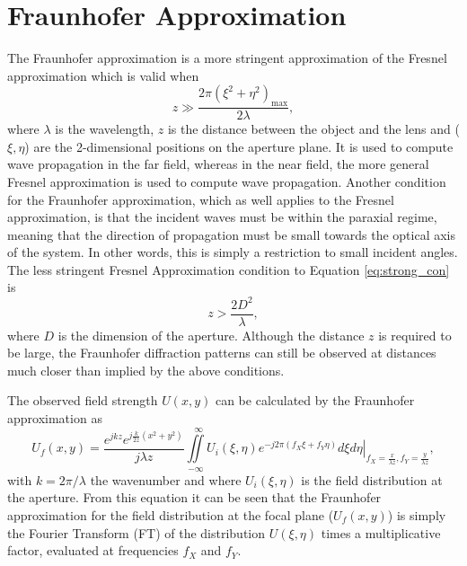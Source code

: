 \section{Fraunhofer Approximation}
\label{sec:FrApprox}
The Fraunhofer approximation is a more stringent approximation of the Fresnel approximation which is valid when
\begin{equation}
z\gg\frac{2\pi(\xi^2+\eta^2)_{\text{max}}}{2\lambda},
\label{eq:strong_con}
\end{equation}
where $\lambda$ is the wavelength, $z$ is the distance between the object and the lens and ($\xi,\eta$) are the 2-dimensional positions on the aperture plane. It is used to compute wave propagation in the far field, whereas in the near field, the more general Fresnel approximation is used to compute wave propagation. Another condition for the Fraunhofer approximation, which as well applies to the Fresnel approximation, is that the incident waves must be within the paraxial regime, meaning that the direction of propagation must be small towards the optical axis of the system. In other words, this is simply a restriction to small incident angles. The less stringent Fresnel Approximation condition to Equation \eqref{eq:strong_con} is 
\begin{equation}
z>\frac{2D^2}{\lambda},
\label{eq:normal_con}
\end{equation}
where $D$ is the dimension of the aperture. Although the distance $z$ is required to be large, the Fraunhofer diffraction patterns can still be observed at distances much closer than implied by the above conditions. 

The observed field strength $U(x,y)$ can be calculated by the Fraunhofer approximation as
\begin{equation}
U_f(x,y)=\frac{e^{jkz}e^{j\frac{k}{2z}(x^2+y^2)}}{j\lambda z}\iint\limits_{-\infty}^{~~~\infty} \left. U_i(\xi,\eta)e^{-j2\pi(f_X\xi+f_Y\eta)}d\xi d\eta \right|_{f_X=\frac{x}{\lambda z},f_Y=\frac{y}{\lambda z}},
\label{eq:fraunhofer}
\end{equation}
with $k=2\pi/\lambda$ the wavenumber and where $U_i(\xi,\eta)$ is the field distribution at the aperture. From this equation it can be seen that the Fraunhofer approximation for the field distribution at the focal plane ($U_f(x,y)$) is simply the Fourier Transform (FT) of the distribution $U(\xi,\eta)$ times a multiplicative factor, evaluated at frequencies $f_X$ and $f_Y$.

